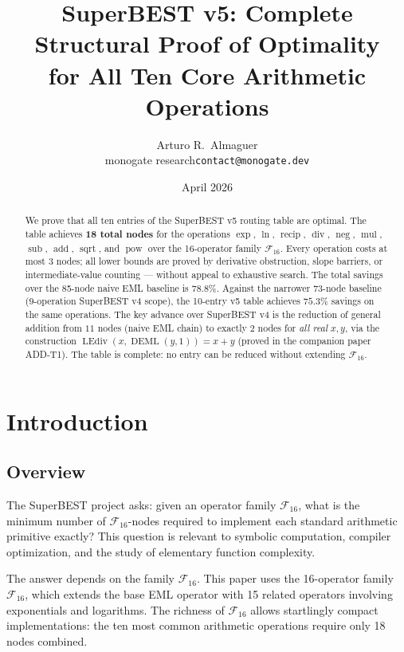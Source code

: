 \documentclass[12pt,a4paper]{article}
\title{SuperBEST v5: Complete Structural Proof of Optimality\\
       for All Ten Core Arithmetic Operations}
\author{Arturo R.\ Almaguer\\
  \small monogate research\quad\texttt{contact@monogate.dev}}
\date{April 2026}
\theoremstyle{definition}
\newcommand{\DEML}{\operatorname{DEML}}
\newcommand{\LEdiv}{\operatorname{LEdiv}}
\newcommand{\recip}{\operatorname{recip}}
\newcommand{\divop}{\operatorname{div}}
\newcommand{\mulop}{\operatorname{mul}}
\newcommand{\subop}{\operatorname{sub}}
\newcommand{\addop}{\operatorname{add}}
\newcommand{\negop}{\operatorname{neg}}
\newcommand{\powop}{\operatorname{pow}}
\newcommand{\sqrtop}{\operatorname{sqrt}}
\newcommand{\F}{\mathcal{F}_{16}}
\begin{document}
\maketitle

\begin{abstract}
We prove that all ten entries of the SuperBEST v5 routing table are optimal.
The table achieves \textbf{18 total nodes} for the operations
$\exp$, $\ln$, $\recip$, $\divop$, $\negop$, $\mulop$, $\subop$, $\addop$, $\sqrtop$,
and $\powop$ over the 16-operator family $\mathcal{F}_{16}$.
Every operation costs at most 3 nodes; all lower bounds are proved by
derivative obstruction, slope barriers, or intermediate-value counting ---
without appeal to exhaustive search.
The total savings over the 85-node naive EML baseline is $\mathbf{78.8\%}$.
Against the narrower 73-node baseline (9-operation SuperBEST v4 scope),
the 10-entry v5 table achieves $\mathbf{75.3\%}$ savings on the same operations.
The key advance over SuperBEST v4 is the reduction of general addition from
$11$ nodes (naive EML chain) to exactly $2$ nodes for \emph{all real} $x, y$,
via the construction $\LEdiv(x, \DEML(y,1)) = x + y$
(proved in the companion paper ADD-T1).
The table is complete: no entry can be reduced without extending $\F$.
\end{abstract}

\tableofcontents

\section{Introduction}
\label{sec:intro}

\subsection{Overview}

The SuperBEST project asks: given an operator family $\F$, what is the minimum
number of $\F$-nodes required to implement each standard arithmetic primitive exactly?
This question is relevant to symbolic computation, compiler optimization, and
the study of elementary function complexity.

The answer depends on the family $\F$.  This paper uses the 16-operator family
$\mathcal{F}_{16}$, which extends the base EML operator with 15 related operators
involving exponentials and logarithms.  The richness of $\F$ allows startlingly
compact implementations: the ten most common arithmetic operations require only
18 nodes combined.
\end{document}
